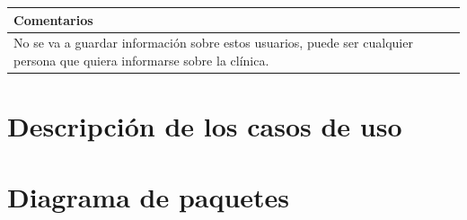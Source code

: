 \documentclass[11pt,a4paper]{article}
\begin{document}
\vspace{1cm}

\begin{table}[H]
	\begin{tabularx}{\textwidth}{lXX}
		\textbf{Comentarios} &  &  \\ \hline
		No se va a guardar información sobre estos usuarios, puede ser cualquier persona que quiera informarse sobre la clínica.
	\end{tabularx}
\end{table}







\section{Descripción de los casos de uso}


\section{Diagrama de paquetes}

	
\end{document}
